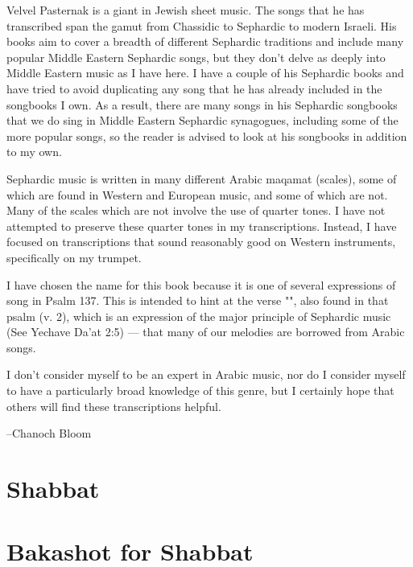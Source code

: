 \documentclass[letterpaper]{memoir}
\newcommand{\song}[2]{}
\begin{document}
Velvel Pasternak is a giant in Jewish sheet music. The songs that he has 
transcribed span the gamut from Chassidic to Sephardic to modern 
Israeli. His books aim to cover a breadth of different Sephardic 
traditions and include many popular Middle Eastern Sephardic songs, but 
they don't delve as deeply into Middle Eastern music as I have here.
I have a couple of his Sephardic books and have tried to avoid 
duplicating any song that he has already included in the songbooks I 
own.
As a result, there are many songs in his Sephardic songbooks 
that we do sing in Middle Eastern Sephardic synagogues, including some 
of the more popular songs, so the reader is advised to look at his 
songbooks in addition to my own.

Sephardic music is written in many different Arabic maqamat (scales), some of 
which are found in Western and European music, and some of which are not. 
Many of the scales which are not involve the use of 
quarter tones. I have not attempted to preserve these quarter tones in my 
transcriptions. Instead, I have focused on transcriptions that sound 
reasonably good on Western instruments, specifically on my trumpet.

I have chosen the name  for this book because it is one 
of several expressions of song in Psalm 137. This is intended to hint at the verse
"", also found in that psalm (v. 2), 
which is an expression of the major principle of Sephardic music (See 
Yechave Da'at 2:5) --- that many of our melodies are borrowed from 
Arabic songs.

I don't consider myself to be an expert in Arabic music, nor do I 
consider myself to have a particularly broad knowledge of this genre,
but I certainly hope that others will find these transcriptions helpful.

--Chanoch Bloom


\chapter{Shabbat}
\song{Yom HaShabbat Ein Kamohu (Turkish)}{Yom_HaShabbat_Ein_Kamohu_Turkish.pdf}
\song{Ashir La'el Asher Shavat}{Ashir_Lael_Asher_Shavat.pdf}

\chapter{Bakashot for Shabbat}
\song{Ki Eshmerah Shabbat (Turkish)}{Ki_Eshmerah_Shabbat_Turkish.pdf}
\song{Yom Zeh Shiru La'el}{Yom_Zeh_Shiru_Lael.pdf}
\song{Yoducha Rayonai}{Yoducha_Rayonai.pdf}
\song{Yoducha Rayonai (Turkish)}{Yoducha_Rayonai_Turkish_with_octave_up.pdf}
\song{Yedid Nefesh}{Yedid_Nefesh.pdf}
\song{Agadelcha}{Agadelcha.pdf}
\end{document}
